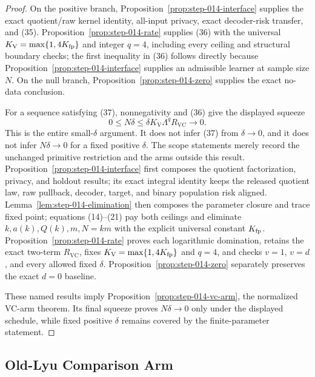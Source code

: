 \begin{proof}
On the positive branch,
Proposition~\ref{prop:step-014-interface} supplies the exact quotient/raw
kernel identity, all-input privacy, exact decoder-risk transfer, and (35).
Proposition~\ref{prop:step-014-rate} supplies (36) with the universal
\(K_{\mathrm V}=\max\{1,4K_{\rm fp}\}\) and integer \(q=4\), including every ceiling
and structural boundary checks; the first inequality in (36) follows
directly because Proposition~\ref{prop:step-014-interface} supplies an
admissible learner at sample size \(N\). On the null branch,
Proposition~\ref{prop:step-014-zero} supplies the exact no-data conclusion.

For a sequence satisfying (37), nonnegativity and (36) give the displayed
squeeze
\[
 0\leq N\delta
 \leq\delta K_{\mathrm V}\Lambda^qR_{\mathrm{VC}}
 \longrightarrow0.
\tag{38}
\]
This is the entire small-\(\delta\) argument. It does not infer (37) from
\(\delta\to0\), and it does not infer \(N\delta\to0\) for a fixed positive
\(\delta\). The scope statements merely record the unchanged primitive
restriction and the arms outside this result. 
Proposition~\ref{prop:step-014-interface} first composes the quotient
factorization, privacy, and holdout results; its exact integral identity keeps
the released quotient law, raw pullback, decoder, target, and binary
population risk aligned. Lemma~\ref{lem:step-014-elimination} then composes
the parameter closure and trace fixed point; equations (14)--(21) pay both ceilings
and eliminate \(k,a(k),Q(k),m,N=km\) with the explicit universal constant
\(K_{\rm fp}\). Proposition~\ref{prop:step-014-rate} proves each logarithmic
domination, retains the exact two-term \(R_{\mathrm{VC}}\), fixes
\(K_{\mathrm V}=\max\{1,4K_{\rm fp}\}\) and \(q=4\), and checks \(v=1\), \(v=d\), and
every allowed fixed \(\delta\). Proposition~\ref{prop:step-014-zero}
separately preserves the exact \(d=0\) baseline.

These named results imply Proposition~\ref{prop:step-014-vc-arm}, the
normalized VC-arm theorem. Its final squeeze proves \(N\delta\to0\) only
under the displayed schedule, while fixed positive \(\delta\) remains covered
by the finite-parameter statement.



\end{proof}

\subsection{Old-Lyu Comparison Arm}\label{app:step_015}


